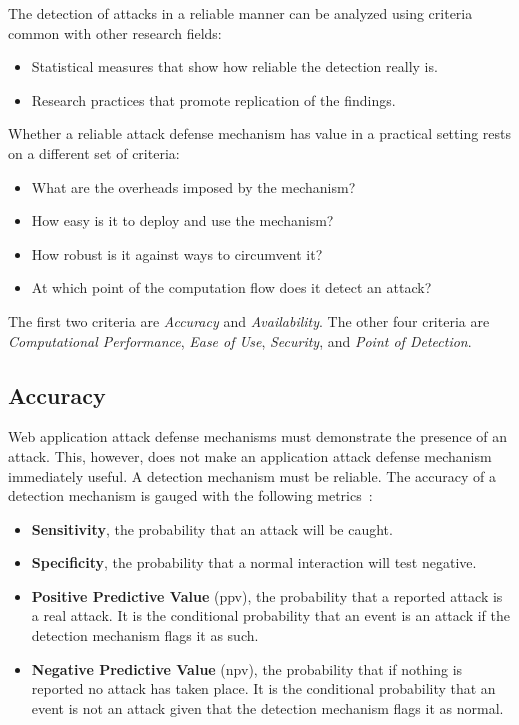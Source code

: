 \documentclass[conference]{IEEEtran}
\begin{document}
The detection of attacks in a reliable manner can be analyzed using
criteria common with other research fields:
\begin{itemize}
\item Statistical measures that show how reliable the detection really
  is.
\item Research practices that promote replication of the findings.
\end{itemize}

Whether a reliable attack defense mechanism has value in a practical
setting rests on a different set of criteria:
\begin{itemize}
\item What are the overheads imposed by the mechanism?
\item How easy is it to deploy and use the mechanism?
\item How robust is it against ways to circumvent it?
\item At which point of the computation flow does it detect an attack?
\end{itemize}

The first two criteria are \emph{Accuracy} and
\emph{Availability}. The other four criteria are \emph{Computational
  Performance}, \emph{Ease of Use}, \emph{Security}, and
\emph{Point of Detection}.

\subsection{Accuracy}
\label{ssec:diagnostic-performance}

Web application attack defense mechanisms
must demonstrate the presence of an attack. This, however, does not
make an application attack defense mechanism immediately useful. A
detection mechanism must be reliable. The accuracy of a detection
mechanism is gauged with the following
metrics~\cite{TDR2013,GFDLS06,A00}:
\begin{itemize}
\item {\bf Sensitivity}, the probability that an attack will be
  caught.
\item {\bf Specificity}, the probability that a normal interaction
  will test negative.
\item {\bf Positive Predictive Value} ({\sc ppv}), the probability that a
  reported attack is a real attack. It is the conditional probability
  that an event is an attack if the detection mechanism flags it as
  such. 
\item {\bf Negative Predictive Value} ({\sc npv}), the probability that if
  nothing is reported no attack has taken place. It is the conditional
  probability that an event is not an attack given that the detection
  mechanism flags it as normal.
\end{itemize}
\end{document}
